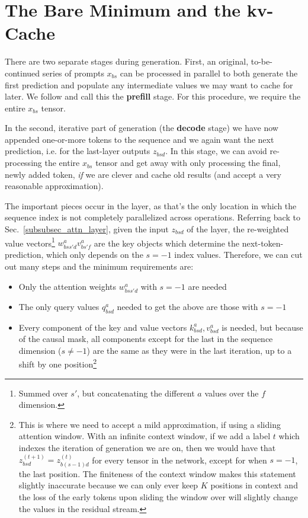\documentclass[11pt]{article}
\begin{document}
\section{The Bare Minimum and the kv-Cache \label{sec_kv_cache}}


There are two separate stages during generation. First, an original, to-be-continued series of prompts
$ x _{ bs }  $ can be processed in parallel to both generate the first prediction and populate any
intermediate values we may want to cache for later. We follow \cite{pope2022efficiently} and call this the
\textbf{prefill} stage. For this procedure, we require the entire $ x _{ bs } $ tensor.

In the second, iterative part of generation (the \textbf{decode} stage) we have now appended
one-or-more tokens to the sequence and we again want the next prediction, i.e. 
for the last-layer outputs $ z _{ bsd } $. In this stage, we can avoid re-processing the entire $ x
		_{ bs } $ tensor and get away with only processing the final, newly added token, \textit{if} we are
clever and cache old results (and accept a very reasonable approximation).

The important pieces occur in the  layer, as that's the only location in
which the sequence index is not completely parallelized across operations. Referring back to
Sec.~\ref{subsubsec_attn_layer}, given the input $ z _{ bsd } $ of the 
layer, the re-weighted value vectors\footnote{Summed over $ s' $, but concatenating the different $
		a $ values over the $ f $ dimension.} $ w ^{ a }_{ bss'd } v ^{ a } _{ bs'f } $ are the key objects
which determine the next-token-prediction, which only depends on the $ s=-1 $ index values.
Therefore, we can cut out many steps and the minimum requirements are:
\begin{itemize}
	\item Only the attention weights $ w ^{ a }_{ bss'd }$ with $ s=-1 $ are needed
	\item The only query values $ q ^{ a }_{ bsd } $ needed to get the above are those with $ s=-1 $
	\item Every component of the key and value vectors $k ^{ a }_{ bsd }, v ^{ a }_{ bsd } $ is
          needed, but because of the causal mask, all components except for the last in the sequence
          dimension ($ s\neq -1 $) are the same as they were in the last iteration, up to a shift by
          one position\footnote{This is where we need to accept a mild approximation, if using a
              sliding attention window. With an infinite context window, if we add a label $ t $
              which indexes the iteration of generation we are on, then we would have that $ z ^{
              (t+1) } _{ bsd } = z ^{ (t)} _{ b (s-1)d } $ for every tensor in the network, except
              for when $ s=-1 $, the last position. The finiteness of the context window makes this
              statement slightly inaccurate because we can only ever keep $ K $ positions in context
              and the loss of the early tokens upon sliding the window over will slightly change the
          values in the residual stream.}
\end{itemize}
\end{document}
